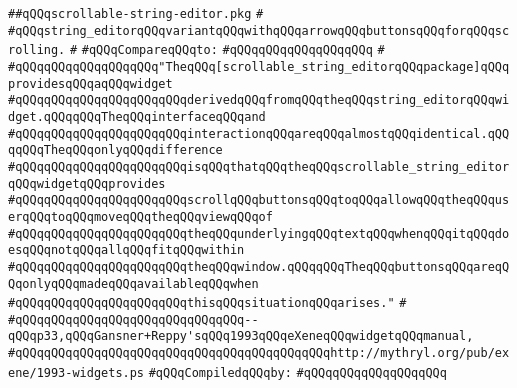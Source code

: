\label{src/lib/x-kit/widget/old/text/scrollable-string-editor.api}
\verb|##qQQqscrollable-string-editor.pkg|\newline
\verb|#|\newline
\verb|#qQQqstring_editorqQQqvariantqQQqwithqQQqarrowqQQqbuttonsqQQqforqQQqscrolling.|\newline
\verb|#|\newline
\verb|#qQQqCompareqQQqto:|\newline
\verb|#qQQqqQQqqQQqqQQqqQQq|\newline
\verb|#|\newline
\verb|#qQQqqQQqqQQqqQQqqQQq"TheqQQq[scrollable_string_editorqQQqpackage]qQQqprovidesqQQqaqQQqwidget|\newline
\verb|#qQQqqQQqqQQqqQQqqQQqqQQqderivedqQQqfromqQQqtheqQQqstring_editorqQQqwidget.qQQqqQQqTheqQQqinterfaceqQQqand|\newline
\verb|#qQQqqQQqqQQqqQQqqQQqqQQqinteractionqQQqareqQQqalmostqQQqidentical.qQQqqQQqTheqQQqonlyqQQqdifference|\newline
\verb|#qQQqqQQqqQQqqQQqqQQqqQQqisqQQqthatqQQqtheqQQqscrollable_string_editorqQQqwidgetqQQqprovides|\newline
\verb|#qQQqqQQqqQQqqQQqqQQqqQQqscrollqQQqbuttonsqQQqtoqQQqallowqQQqtheqQQquserqQQqtoqQQqmoveqQQqtheqQQqviewqQQqof|\newline
\verb|#qQQqqQQqqQQqqQQqqQQqqQQqtheqQQqunderlyingqQQqtextqQQqwhenqQQqitqQQqdoesqQQqnotqQQqallqQQqfitqQQqwithin|\newline
\verb|#qQQqqQQqqQQqqQQqqQQqqQQqtheqQQqwindow.qQQqqQQqTheqQQqbuttonsqQQqareqQQqonlyqQQqmadeqQQqavailableqQQqwhen|\newline
\verb|#qQQqqQQqqQQqqQQqqQQqqQQqthisqQQqsituationqQQqarises."|\newline
\verb|#|\newline
\verb|#qQQqqQQqqQQqqQQqqQQqqQQqqQQqqQQq--qQQqp33,qQQqGansner+Reppy'sqQQq1993qQQqeXeneqQQqwidgetqQQqmanual,|\newline
\verb|#qQQqqQQqqQQqqQQqqQQqqQQqqQQqqQQqqQQqqQQqqQQqhttp://mythryl.org/pub/exene/1993-widgets.ps|\newline
\newline
\verb|#qQQqCompiledqQQqby:|\newline
\verb|#qQQqqQQqqQQqqQQqqQQq|\newline
\newline
